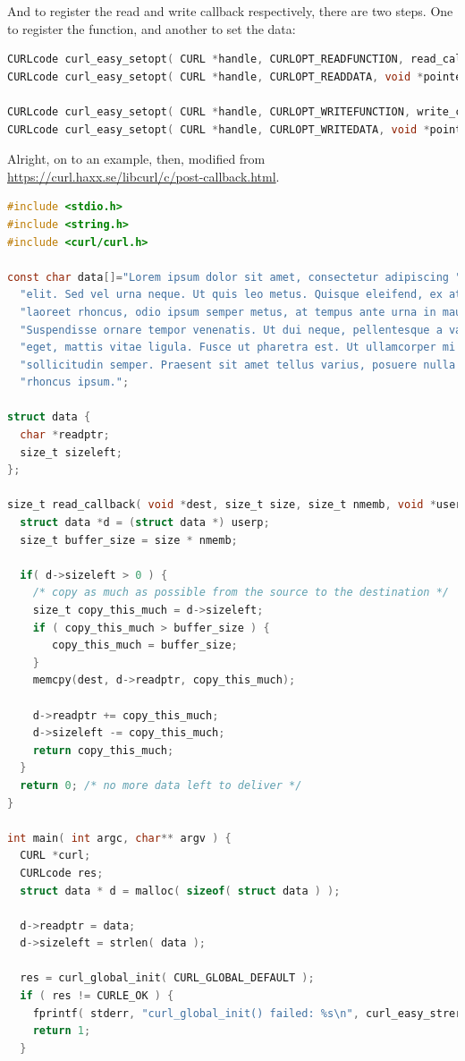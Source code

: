 \documentclass[a4paper]{report}
\begin{document}
And to register the read and write callback respectively, there are two steps. One to register the function, and another to set the data:
\begin{lstlisting}[language=C]
CURLcode curl_easy_setopt( CURL *handle, CURLOPT_READFUNCTION, read_callback );
CURLcode curl_easy_setopt( CURL *handle, CURLOPT_READDATA, void *pointer );

CURLcode curl_easy_setopt( CURL *handle, CURLOPT_WRITEFUNCTION, write_callback );
CURLcode curl_easy_setopt( CURL *handle, CURLOPT_WRITEDATA, void *pointer );
\end{lstlisting}

Alright, on to an example, then, modified from \url{https://curl.haxx.se/libcurl/c/post-callback.html}.

\begin{lstlisting}[language=C]
#include <stdio.h>
#include <string.h>
#include <curl/curl.h>
  
const char data[]="Lorem ipsum dolor sit amet, consectetur adipiscing "
  "elit. Sed vel urna neque. Ut quis leo metus. Quisque eleifend, ex at "
  "laoreet rhoncus, odio ipsum semper metus, at tempus ante urna in mauris. "
  "Suspendisse ornare tempor venenatis. Ut dui neque, pellentesque a varius "
  "eget, mattis vitae ligula. Fusce ut pharetra est. Ut ullamcorper mi ac "
  "sollicitudin semper. Praesent sit amet tellus varius, posuere nulla non, "
  "rhoncus ipsum.";
 
struct data {
  char *readptr;
  size_t sizeleft;
};
 
size_t read_callback( void *dest, size_t size, size_t nmemb, void *userp ) {
  struct data *d = (struct data *) userp;
  size_t buffer_size = size * nmemb;
 
  if( d->sizeleft > 0 ) {
    /* copy as much as possible from the source to the destination */ 
    size_t copy_this_much = d->sizeleft;
    if ( copy_this_much > buffer_size ) {
       copy_this_much = buffer_size;
    }
    memcpy(dest, d->readptr, copy_this_much);
 
    d->readptr += copy_this_much;
    d->sizeleft -= copy_this_much;
    return copy_this_much; 
  }
  return 0; /* no more data left to deliver */ 
}
 
int main( int argc, char** argv ) {
  CURL *curl;
  CURLcode res;
  struct data * d = malloc( sizeof( struct data ) );
 
  d->readptr = data;
  d->sizeleft = strlen( data );
 
  res = curl_global_init( CURL_GLOBAL_DEFAULT );
  if ( res != CURLE_OK ) {
    fprintf( stderr, "curl_global_init() failed: %s\n", curl_easy_strerror( res ) );
    return 1;
  }
 

\end{lstlisting}
\end{document}
